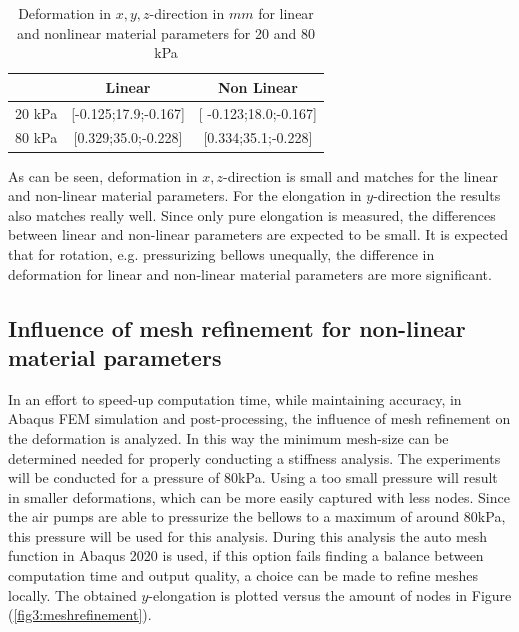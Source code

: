 \begin{table}[H]
    \centering
    \begin{tabular}{|c|c|c|}  \hline
    & \textbf{Linear}    &  \textbf{Non Linear}    \\ \hline
      [x;y;z] 20 kPa   &  [-0.125;17.9;-0.167]     &         [ -0.123;18.0;-0.167]           \\ \hline
     [x,y,z] 80 kPa   &  [0.329;35.0;-0.228]    &       [0.334;35.1;-0.228]             \\ \hline
    \end{tabular}
    \caption{Deformation in  $x,y,z$-direction in $mm$ for linear and nonlinear material parameters for 20 and 80 kPa}
    \label{tab3:linnonlindef}
\end{table}

As can be seen, deformation in $x,z$-direction is small and matches for the linear and non-linear material parameters. For the elongation in $y$-direction the results also matches really well. Since only pure elongation is measured, the differences between linear and non-linear parameters are expected to be small. It is expected that for rotation, e.g. pressurizing bellows unequally, the difference in deformation for linear and non-linear material parameters are more significant.

\newpage
\subsection{Influence of mesh refinement for non-linear material parameters}

In an effort to speed-up computation time, while maintaining accuracy, in Abaqus FEM simulation and post-processing, the influence of mesh refinement on the deformation is analyzed. In this way the minimum mesh-size can be determined needed for properly conducting a stiffness analysis. The experiments will be conducted for a pressure of 80kPa. Using a too small pressure will result in smaller deformations, which can be more easily captured with less nodes. Since the air pumps are able to pressurize the bellows to a maximum of around 80kPa, this pressure will be used for this analysis. During this analysis the auto mesh function in Abaqus 2020 is used, if this option fails finding a balance between computation time and output quality, a choice can be made to refine meshes locally. The obtained $y$-elongation is plotted versus the amount of nodes in Figure (\ref{fig3:meshrefinement}).

